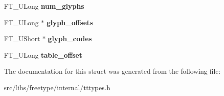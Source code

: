 \begin{DoxyCompactItemize}
\item 
\hypertarget{struct_t_t___s_bit___range_rec___afd9437150f8d9f784f98da6d61223464}{
FT\_\-ULong {\bfseries num\_\-glyphs}}
\label{struct_t_t___s_bit___range_rec___afd9437150f8d9f784f98da6d61223464}

\item 
\hypertarget{struct_t_t___s_bit___range_rec___a475f649f101b5886cc2443934e6aa9ca}{
FT\_\-ULong $\ast$ {\bfseries glyph\_\-offsets}}
\label{struct_t_t___s_bit___range_rec___a475f649f101b5886cc2443934e6aa9ca}

\item 
\hypertarget{struct_t_t___s_bit___range_rec___ad40d4aa7e48bdb4ab8c98850f1bba178}{
FT\_\-UShort $\ast$ {\bfseries glyph\_\-codes}}
\label{struct_t_t___s_bit___range_rec___ad40d4aa7e48bdb4ab8c98850f1bba178}

\item 
\hypertarget{struct_t_t___s_bit___range_rec___a54457937305b5ccf895f5b23c0cc6006}{
FT\_\-ULong {\bfseries table\_\-offset}}
\label{struct_t_t___s_bit___range_rec___a54457937305b5ccf895f5b23c0cc6006}

\end{DoxyCompactItemize}


The documentation for this struct was generated from the following file:\begin{DoxyCompactItemize}
\item 
src/libs/freetype/internal/tttypes.h\end{DoxyCompactItemize}
